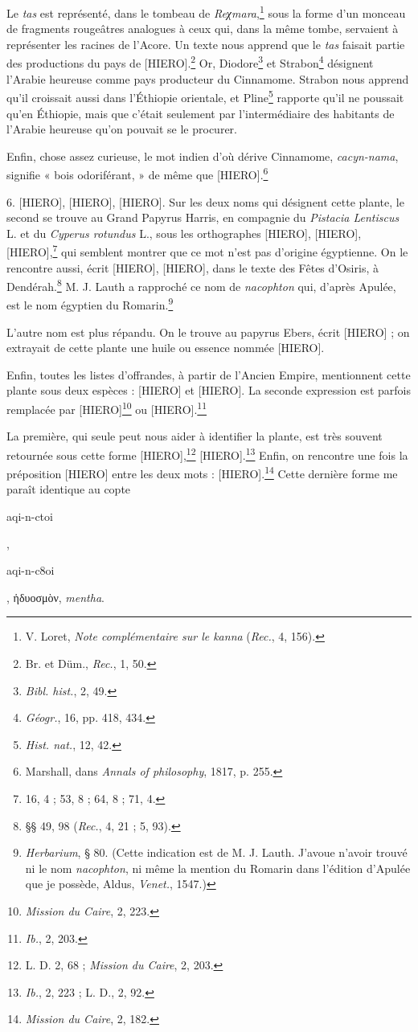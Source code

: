 \documentclass[a4paper, 11pt, oneside]{article}
\begin{document}
Le \emph{tas} est représenté, dans le tombeau de \emph{Reχmara},\footnote{V. Loret, \emph{Note complémentaire sur le kanna} (\emph{Rec.}, 4, 156).} sous la forme d'un monceau de fragments rougeâtres analogues à ceux qui, dans la même tombe, servaient à représenter les racines de l'Acore. Un texte nous apprend que le \emph{tas} faisait partie des productions du pays de [HIERO].\footnote{Br. et Düm., \emph{Rec.}, 1, 50.} Or, Diodore\footnote{\emph{Bibl. hist.}, 2, 49.} et Strabon\footnote{\emph{Géogr.}, 16, pp. 418, 434.} désignent l'Arabie heureuse comme pays producteur du Cinnamome. Strabon nous apprend qu'il croissait aussi dans l'Éthiopie orientale, et Pline\footnote{\emph{Hist. nat.}, 12, 42.} rapporte qu'il ne poussait qu'en Éthiopie, mais que c'était seulement par l'intermédiaire des habitants de l'Arabie heureuse qu'on pouvait se le procurer.

Enfin, chose assez curieuse, le mot indien d'où dérive Cinnamome, \emph{cacyn-nama}, signifie « bois odoriférant, » de même que [HIERO].\footnote{Marshall, dans \emph{Annals of philosophy}, 1817, p. 255.}

6. [HIERO], [HIERO], [HIERO]. Sur les deux noms qui désignent cette plante, le second se trouve au Grand Papyrus Harris, en compagnie du \emph{Pistacia Lentiscus} L. et du \emph{Cyperus rotundus} L., sous les orthographes [HIERO], [HIERO], [HIERO],\footnote{16, 4 ; 53, 8 ; 64, 8 ; 71, 4.} qui semblent montrer que ce mot n'est pas d'origine égyptienne. On le rencontre aussi, écrit [HIERO], [HIERO], dans le texte des Fêtes d'Osiris, à Dendérah.\footnote{§§ 49, 98 (\emph{Rec.}, 4, 21 ; 5, 93).} M. J. Lauth a rapproché ce nom de \emph{nacophton} qui, d'après Apulée, est le nom égyptien du Romarin.\footnote{\emph{Herbarium}, § 80. (Cette indication est de M. J. Lauth. J'avoue n'avoir trouvé ni le nom \emph{nacophton}, ni même la mention du Romarin dans l'édition d'Apulée que je possède, Aldus, \emph{Venet.}, 1547.)}

L'autre nom est plus répandu. On le trouve au papyrus Ebers, écrit [HIERO] ; on extrayait de cette plante une huile ou essence nommée [HIERO].

Enfin, toutes les listes d'offrandes, à partir de l'Ancien Empire, mentionnent cette plante sous deux espèces : [HIERO] et [HIERO]. La seconde expression est parfois remplacée par [HIERO]\footnote{\emph{Mission du Caire}, 2, 223.} ou [HIERO].\footnote{\emph{Ib.}, 2, 203.}

La première, qui seule peut nous aider à identifier la plante, est très souvent retournée sous cette forme [HIERO],\footnote{L. D. 2, 68 ; \emph{Mission du Caire}, 2, 203.} [HIERO].\footnote{\emph{Ib.}, 2, 223 ; L. D., 2, 92.} Enfin, on rencontre une fois la préposition [HIERO] entre les deux mots : [HIERO].\footnote{\emph{Mission du Caire}, 2, 182.} Cette dernière forme me paraît identique au copte \begin{coptic}aqi-n-ctoi\end{coptic}, \begin{coptic}aqi-n-c8oi\end{coptic}, ἡδυοσμὸν, \emph{mentha}.
\end{document}
